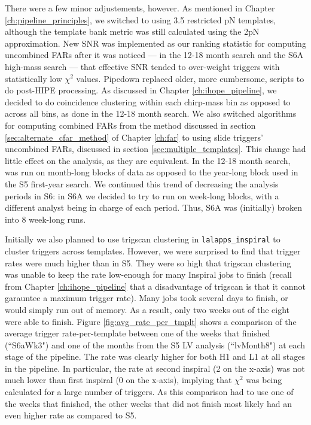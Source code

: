 There were a few minor adjustements, however. As mentioned in Chapter \ref{ch:pipeline_principles}, we switched to using 3.5 restricted \ac{pN} templates, although the template bank metric was still calculated using the 2\ac{pN} approximation. New \ac{SNR} was implemented as our ranking statistic for computing uncombined \acp{FAR} after it was noticed --- in the 12-18 month search and the S6A high-mass search --- that effective \ac{SNR} tended to over-weight triggers with statistically low $\chi^2$ values. Pipedown replaced older, more cumbersome, scripts to do post-\ac{HIPE} processing. As discussed in Chapter \ref{ch:ihope_pipeline}, we decided to do coincidence clustering within each chirp-mass bin as opposed to across all bins, as done in the 12-18 month search. We also switched algorithms for computing combined \acp{FAR} from the method discussed in section \ref{sec:alternate_cfar_method} of Chapter \ref{ch:far} to using slide triggers' uncombined \acp{FAR}, discussed in section \ref{sec:multiple_templates}. This change had little effect on the analysis, as they are equivalent. In the 12-18 month search, \ihope was run on month-long blocks of data as opposed to the year-long block used in the \ac{S5} first-year search. We continued this trend of decreasing the analysis periods in \ac{S6}: in S6A we decided to try to run \ihope on week-long blocks, with a different analyst being in charge of each period. Thus, S6A was (initially) broken into 8 week-long runs.

Initially we also planned to use trigscan clustering in \verb|lalapps_inspiral| to cluster triggers across templates. However, we were surprised to find that trigger rates were much higher than in \ac{S5}. They were so high that trigscan clustering was unable to keep the rate low-enough for many Inspiral jobs to finish (recall from Chapter \ref{ch:ihope_pipeline} that a disadvantage of trigscan is that it cannot garauntee a maximum trigger rate). Many jobs took several days to finish, or would simply run out of memory. As a result, only two weeks out of the eight were able to finish. Figure \ref{fig:avg_rate_per_tmplt} shows a comparison of the average trigger rate-per-template between one of the weeks that finished (``S6aWk3") and one of the months from the \ac{S5} LV analysis (``lvMonth8") at each stage of the pipeline. The rate was clearly higher for both H1 and L1 at all stages in the pipeline. In particular, the rate at second inspiral (2 on the x-axis) was not much lower than first inspiral (0 on the x-axis), implying that $\chi^2$ was being calculated for a large number of triggers. As this comparison had to use one of the weeks that finished, the other weeks that did not finish most likely had an even higher rate as compared to \ac{S5}.

